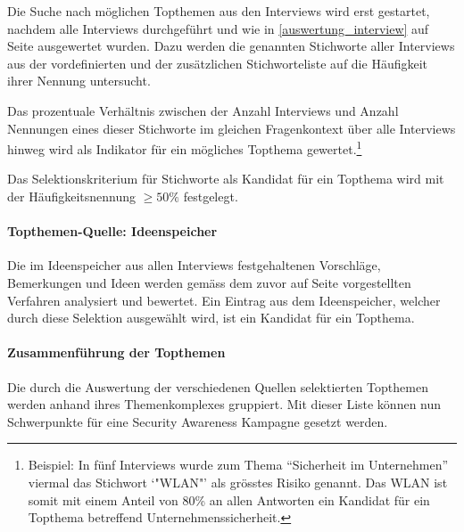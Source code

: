 \documentclass[../../main.tex]{subfiles}
\begin{document}
\begin{sloppypar}
Die Suche nach möglichen Topthemen aus den Interviews wird erst gestartet, nachdem alle Interviews durchgeführt und wie in \ref{auswertung_interview} auf Seite \pageref{auswertung_interview} ausgewertet wurden. Dazu werden die genannten Stichworte aller Interviews aus der vordefinierten und der zusätzlichen Stichworteliste auf die Häufigkeit ihrer Nennung untersucht.

Das prozentuale Verhältnis zwischen der Anzahl Interviews und Anzahl Nennungen eines dieser Stichworte im gleichen Fragenkontext über alle Interviews hinweg wird als Indikator für ein mögliches Topthema gewertet.\footnote{Beispiel: In fünf Interviews wurde zum Thema "`Sicherheit im Unternehmen"' viermal das Stichwort `"WLAN"' als grösstes Risiko genannt. Das WLAN ist somit mit einem Anteil von 80\% an allen Antworten ein Kandidat für ein Topthema betreffend Unternehmenssicherheit.}

Das Selektionskriterium für Stichworte als Kandidat für ein Topthema wird mit der Häufigkeitsnennung $\ge  50\%$ festgelegt.
\end{sloppypar}

\paragraph*{Topthemen-Quelle: Ideenspeicher}\mbox{}

\begin{sloppypar}
Die im Ideenspeicher aus allen Interviews festgehaltenen Vorschläge, Bemerkungen und Ideen werden gemäss dem zuvor auf Seite \pageref{modell_bewertung_ideenspeicher} vorgestellten Verfahren analysiert und bewertet. Ein Eintrag aus dem Ideenspeicher, welcher durch diese Selektion ausgewählt wird, ist ein Kandidat für ein Topthema. 
\end{sloppypar}

\paragraph*{Zusammenführung der Topthemen}\mbox{}

\begin{sloppypar}
Die durch die Auswertung der verschiedenen Quellen selektierten Topthemen werden anhand ihres Themenkomplexes gruppiert. Mit dieser Liste können nun Schwerpunkte für eine Security Awareness Kampagne gesetzt werden.
\end{sloppypar}
\end{document}

